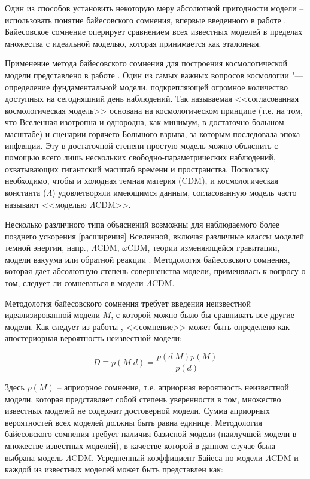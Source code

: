 Один из способов установить некоторую меру абсолютной пригодности модели – использовать понятие байесовского сомнения, 
впервые введенного в работе \cite{starkman2008introducing}. Байесовское сомнение оперирует сравнением всех известных 
моделей в пределах множества с идеальной моделью, которая принимается как эталонная.

Применение метода байесовского сомнения для построения космологической модели представлено в работе 
\cite{march2011should, march2013advanced}. Один из самых важных вопросов космологии "--- определение фундаментальной 
модели, подкрепляющей огромное количество доступных на сегодняшний день наблюдений. Так называемая <<согласованная 
космологическая модель>> основана на космологическом принципе (т.е. на том, что Вселенная изотропна и однородна, 
как минимум, в достаточно большом масштабе) и сценарии горячего Большого взрыва, за которым последовала эпоха инфляции. 
Эту в достаточной степени простую модель можно объяснить с помощью всего лишь нескольких 
свободно-параметрических наблюдений, 
охватывающих гигантский масштаб времени и пространства. Поскольку необходимо, чтобы и холодная темная материя (CDM), 
и космологическая константа ($\Lambda$) удовлетворяли имеющимся данным, согласованную модель часто 
называют <<моделью $\Lambda$CDM>>. 


Несколько различного типа объяснений возможны для наблюдаемого более позднего ускорения [расширения] Вселенной, включая 
различные классы моделей темной энергии, напр., $\Lambda$CDM, $\omega$CDM, теории изменяющейся гравитации, модели 
вакуума или обратной реакции \cite{march2011should}. Методология байесовского сомнения, которая дает абсолютную 
степень совершенства модели, применялась к вопросу о том, следует ли сомневаться в модели $\Lambda$CDM.

Методология байесовского сомнения требует введения неизвестной идеализированной модели $M$, с которой можно было бы 
сравнивать все другие модели. Как следует из работы \cite{starkman2008introducing}, <<сомнение>> может быть определено 
как апостериорная вероятность неизвестной модели:

\begin{equation}
 D \equiv p(M|d) = \frac{p(d|M)p(M)}{p(d)}
\end{equation}

Здесь $p(M)$ – априорное сомнение, т.е. априорная вероятность неизвестной модели, которая представляет собой степень 
уверенности в том, множество известных моделей не содержит достоверной модели. Сумма априорных вероятностей всех 
моделей должны быть равна единице. Методология байесовского сомнения требует наличия базисной модели (наилучшей модели 
в множестве известных моделей), в качестве которой в данном случае была выбрана модель $\Lambda$CDM. Усредненный 
коэффициент Байеса по модели $\Lambda$CDM и каждой из известных моделей может быть представлен как:

